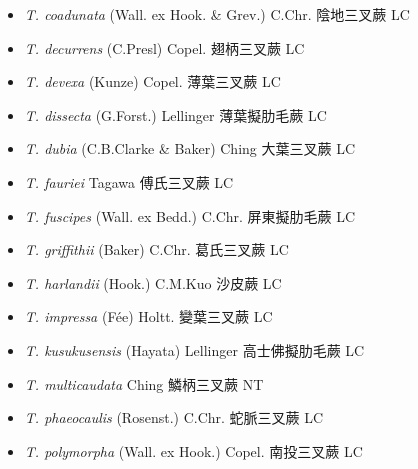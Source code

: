 \begin{itemize}
  \begin{itemize}
        \item[] \textit{T. coadunata} (Wall. ex Hook. \& Grev.) C.Chr.  陰地三叉蕨   LC
        \item[] \textit{T. decurrens} (C.Presl) Copel.  翅柄三叉蕨   LC
        \item[] \textit{T. devexa} (Kunze) Copel.  薄葉三叉蕨   LC
        \item[] \textit{T. dissecta} (G.Forst.) Lellinger  薄葉擬肋毛蕨   LC
        \item[] \textit{T. dubia} (C.B.Clarke \& Baker) Ching  大葉三叉蕨   LC
        \item[] \textit{T. fauriei} Tagawa  傅氏三叉蕨   LC
        \item[] \textit{T. fuscipes} (Wall. ex Bedd.) C.Chr.  屏東擬肋毛蕨   LC
        \item[] \textit{T. griffithii} (Baker) C.Chr.  葛氏三叉蕨   LC
        \item[] \textit{T. harlandii} (Hook.) C.M.Kuo  沙皮蕨   LC
        \item[] \textit{T. impressa} (Fée) Holtt.  變葉三叉蕨   LC
        \item[] \textit{T. kusukusensis} (Hayata) Lellinger  高士佛擬肋毛蕨   LC
        \item[] \textit{T. multicaudata} Ching  鱗柄三叉蕨   NT
        \item[] \textit{T. phaeocaulis} (Rosenst.) C.Chr.  蛇脈三叉蕨   LC
        \item[] \textit{T. polymorpha} (Wall. ex Hook.) Copel.  南投三叉蕨   LC

\end{itemize}
\end{itemize}
